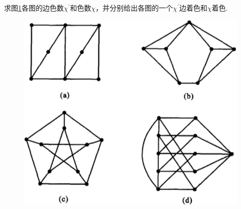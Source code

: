 \documentclass[cn,blue,normal,founder,11pt]{elegantnote}
\begin{document}
\begin{example}
	求图\ref{fig:7.1}各图的边色数\(\chi^{\prime}\)和色数\(\chi\)，并分别给出各图的一个\(\chi^{\prime}\)边着色和\(\chi\)着色.
	\begin{figure}[H]
		\centering
		\includegraphics[scale=0.55]{image/ex7.1.pdf}
		\caption{}
		\label{fig:7.1}
	\end{figure}
\end{example}
\end{document}

